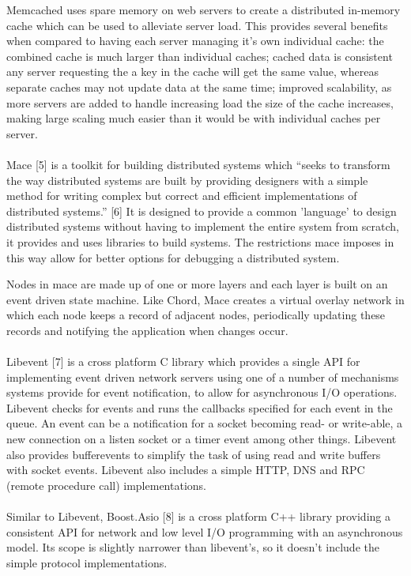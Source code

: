 \documentclass{article}
\begin{document}
Memcached uses spare memory on web servers to create a distributed in-memory cache which can be used to alleviate server load. This provides several benefits when compared to having each server managing it's own individual cache: the combined cache is much larger than individual caches; cached data is consistent any server requesting the a key in the cache will get the same value, whereas separate caches may not update data at the same time; improved scalability, as more servers are added to handle increasing load the size of the cache increases, making large scaling much easier than it would be with individual caches per server.
\\
\\
Mace [5] is a toolkit for building distributed systems which “seeks to transform the way distributed systems are built by providing designers with a simple method for writing complex but correct and efficient implementations of distributed systems.” [6] It is designed to provide a common 'language' to design distributed systems without having to implement the entire system from scratch, it provides and uses libraries to build systems. The restrictions mace imposes in this way allow for better options for debugging a distributed system.

Nodes in mace are made up of one or more layers and each layer is built on an event driven state machine. Like Chord, Mace creates a virtual overlay network in which each node keeps a record of adjacent nodes, periodically updating these records and notifying the application when changes occur.
\\
\\
Libevent [7] is a cross platform C library which provides a single API for implementing event driven network servers using one of a number of mechanisms systems provide for event notification, to allow for asynchronous I/O operations. Libevent checks for events and runs the callbacks specified for each event in the queue. An event can be a notification for a socket becoming read- or write-able, a new connection on a listen socket or a timer event among other things. Libevent also provides bufferevents to simplify the task of using read and write buffers with socket events. Libevent also includes a simple HTTP, DNS and RPC (remote procedure call) implementations.
\\
\\
Similar to Libevent, Boost.Asio [8] is a cross platform C++ library providing a consistent API for network and low level I/O programming with an asynchronous model. Its scope is slightly narrower than libevent's, so it doesn't include the simple protocol implementations.
\end{document}
